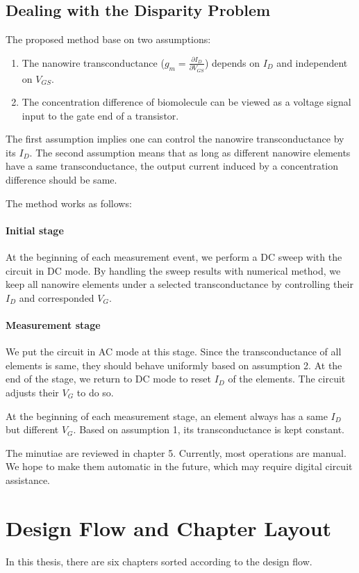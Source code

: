 \subsection*{Dealing with the Disparity Problem} \label{section:twqAssumption}
The proposed method base on two assumptions:
\begin{enumerate}
    \item The nanowire transconductance ($g_m = \frac{\partial I_D}{\partial V_{GS}}$) depends on $I_D$ and independent on $V_{GS}$.
    \item The concentration difference of biomolecule can be viewed as a voltage signal input to the gate end of a transistor.
\end{enumerate}
The first assumption implies one can control the nanowire transconductance by its $I_D$.
The second assumption means that as long as different nanowire elements have a same transconductance, the output current induced by a concentration difference should be same.

The method works as follows:

\paragraph*{Initial stage}
 At the beginning of each measurement event, we perform a DC sweep with the circuit in DC mode.
By handling the sweep results with numerical method, we keep all nanowire elements under a selected transconductance by controlling their $I_D$ and corresponded $V_G$.

\paragraph*{Measurement stage}
We put the circuit in AC mode at this stage.
Since the transconductance of all elements is same, they should behave uniformly based on assumption 2.
At the end of the stage, we return to DC mode to reset $I_D$ of the elements.
The circuit adjusts their $V_G$ to do so.

At the beginning of each measurement stage, an element always has a same $I_D$ but different $V_G$.
Based on assumption 1, its transconductance is kept constant.


The minutiae are reviewed in chapter 5.
Currently, most operations are manual.
We hope to make them automatic in the future, which may require digital circuit assistance.

\section{Design Flow and Chapter Layout}
In this thesis, there are six chapters sorted according to the design flow.

